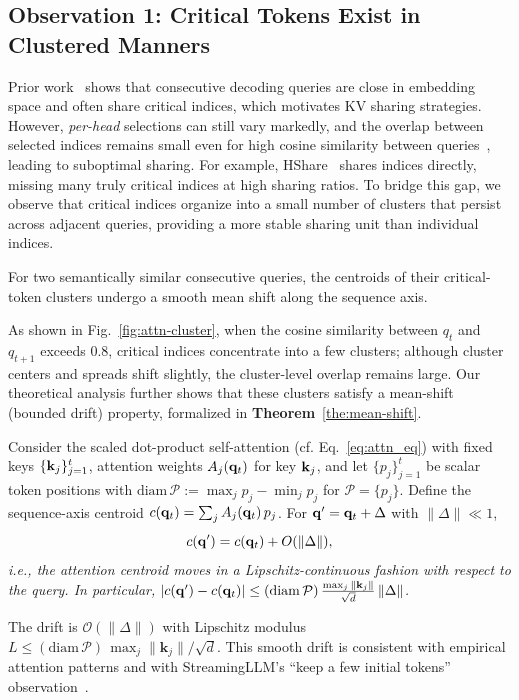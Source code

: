 \subsection{Observation 1: Critical Tokens Exist in Clustered Manners}

Prior work~\cite{sun2024shadowkv,li2024snapkv,wuhshare} shows that consecutive decoding queries are close in embedding space and often share critical indices, which motivates KV sharing strategies. However, \emph{per-head} selections can still vary markedly, and the overlap between selected indices remains small even for high cosine similarity between queries~\cite{wu2024tokenselect}, leading to
suboptimal sharing. For example, HShare~\cite{wuhshare} shares indices directly, missing many truly critical indices at high sharing ratios.
To bridge this gap, we observe that critical indices organize into a small number of clusters that persist across adjacent queries, providing a more stable sharing
unit than individual indices. 

\begin{property}
\label{prop:among-query}
For two semantically similar consecutive queries, the centroids of their critical-token clusters undergo a smooth mean shift along the sequence axis.
\end{property}

As shown in Fig.~\ref{fig:attn-cluster}, when the cosine similarity between $q_t$ and $q_{t+1}$ exceeds $0.8$, critical indices concentrate into a few clusters; although cluster centers and spreads shift slightly, the cluster-level overlap remains large. Our theoretical analysis further shows that these clusters satisfy a mean-shift (bounded drift) property, formalized in \textbf{Theorem}~\ref{the:mean-shift}.

\begin{theorem}
\label{the:mean-shift}
Consider the scaled dot-product self-attention (cf. Eq.~\eqref{eq:attn_eq}) with fixed keys $\{\mathbf{k}_j\}_{j=1}^t$, attention weights $A_j(\mathbf{q}_t)$ for key $\mathbf{k}_j$, and let $\{p_j\}_{j=1}^t$ be scalar token positions with
$\mathrm{diam}\,\mathcal{P}:=\max_j p_j-\min_j p_j$ for $\mathcal{P}=\{p_j\}$. Define the sequence-axis centroid $c(\mathbf{q}_t)=\sum_{j} A_j(\mathbf{q}_t)\,p_j$. For $\mathbf{q}' = \mathbf{q}_t + \Delta$ with $\|\Delta\|\ll 1$,
\begin{equation}
\label{eq:centroid_shift}
    c(\mathbf{q}') = c(\mathbf{q}_t) + O(\|\Delta\|),
\end{equation}
\textit{i.e., the attention centroid moves in a Lipschitz-continuous fashion with respect to the query. In particular, $|c(\mathbf{q}')-c(\mathbf{q}_t)| \le (\mathrm{diam}\,\mathcal{P})\,\frac{\max_j \|\mathbf{k}_j\|}{\sqrt d}\,\|\Delta\|$.}
\end{theorem}
The drift is $\mathcal{O}(\|\Delta\|)$ with Lipschitz modulus
$L \le (\mathrm{diam}\,\mathcal{P})\,\max_j \|\mathbf{k}_j\|/\sqrt{d}$.
This smooth drift is consistent with empirical attention patterns and with
StreamingLLM’s “keep a few initial tokens” observation~\cite{xiao2023streamingllm}.


